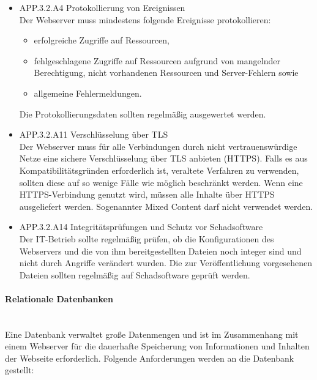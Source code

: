 \begin{itemize}
      \item APP.3.2.A4 Protokollierung von Ereignissen\\
			Der Webserver muss mindestens folgende Ereignisse protokollieren:
\begin{itemize}
\item erfolgreiche Zugriffe auf Ressourcen,
\item fehlgeschlagene Zugriffe auf Ressourcen aufgrund von mangelnder Berechtigung, nicht vorhandenen Ressourcen und Server-Fehlern sowie
\item allgemeine Fehlermeldungen.
\end{itemize}
Die Protokollierungsdaten sollten regelm\"a{\ss}ig ausgewertet werden.\\
			
			\item APP.3.2.A11 Verschl\"usselung \"uber TLS\\
			Der Webserver muss f\"ur alle Verbindungen durch nicht vertrauensw\"urdige Netze eine sichere Verschl\"usselung \"uber TLS anbieten (HTTPS). Falls es aus Kompatibilit\"atsgr\"unden erforderlich ist, veraltete Verfahren zu verwenden, sollten diese auf so wenige F\"alle wie m\"oglich beschr\"ankt werden. Wenn eine HTTPS-Verbindung genutzt wird, m\"ussen alle Inhalte \"uber HTTPS ausgeliefert werden. Sogenannter Mixed Content darf nicht verwendet werden.\\
			
			\item APP.3.2.A14 Integrit\"atspr\"ufungen und Schutz vor Schadsoftware\\
			Der IT-Betrieb sollte regelm\"a{\ss}ig pr\"ufen, ob die Konfigurationen des Webservers und die von ihm bereitgestellten Dateien noch integer sind und nicht durch Angriffe ver\"andert wurden. Die zur Ver\"offentlichung vorgesehenen Dateien sollten regelm\"a{\ss}ig auf Schadsoftware gepr\"uft werden.\\
						
   \end{itemize}   

\paragraph{Relationale Datenbanken}
\noindent \\Eine Datenbank verwaltet gro{\ss}e Datenmengen und ist im Zusammenhang mit einem Webserver f\"ur die dauerhafte Speicherung von Informationen und Inhalten der Webseite erforderlich. Folgende Anforderungen werden an die Datenbank gestellt:

